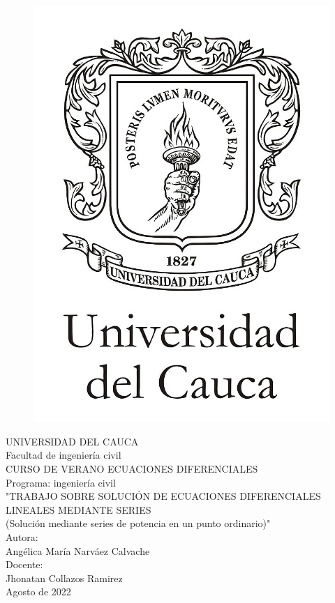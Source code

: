 \documentclass[12pt,letterpaper,oneside]{article}
\begin{document}
\begin{center}
\begin{figure}
\begin{center}
\includegraphics[scale=0.4]{escudo}
\end{center}
\end{figure}
UNIVERSIDAD DEL CAUCA \\
Facultad de ingeniería civil\vspace{3.0cm}\\

CURSO DE VERANO ECUACIONES DIFERENCIALES\\
Programa: ingeniería civil\vspace{1.5cm}\\

"TRABAJO SOBRE SOLUCIÓN DE ECUACIONES DIFERENCIALES LINEALES MEDIANTE SERIES\\
(Solución mediante series de potencia en un punto ordinario)"\vspace{3cm}\\

Autora:\\
Angélica María Narváez Calvache\vspace{1.5cm}\\

Docente:\\
Jhonatan Collazos Ramirez\vspace{3.0cm}\\ 

Agosto de 2022\\

\end{center}
\end{document}
